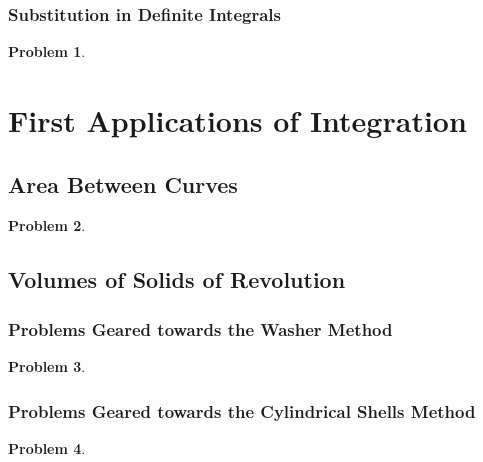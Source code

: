 \documentclass{article}
\newtheorem{problem}{Problem}
\begin{document}
\subsubsection{Substitution in Definite Integrals}
\label{secMPSintegrationSubstitutionRuleDefinite}
\begin{problem}

\end{problem}




\section{First Applications of Integration}
\subsection{Area Between Curves}\label{secMPSareaBetweenCurves}
\begin{problem}

\end{problem}

\subsection{Volumes of Solids of Revolution}\label{secMPSvolumesSolidsRevolution}
\subsubsection{Problems Geared towards the Washer Method}\label{secMPSvolumesSolidsRevolutionWashers}
\begin{problem}

\end{problem}



\subsubsection{Problems Geared towards the Cylindrical Shells Method}\label{secMPSvolumesSolidsRevolutionShells}
\begin{problem}

\end{problem}
\end{document}
